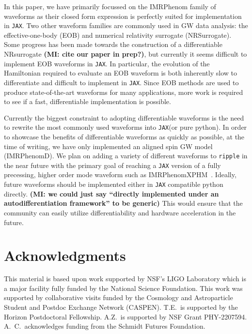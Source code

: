 \documentclass[twocolumn]{aastex631}
\newcommand{\jax}{\texttt{JAX}\xspace}
\newcommand{\ripple}{\texttt{ripple}\xspace}
\newcommand{\mi}[1]{\textbf{\color{teal}(MI: #1)}}
\newcommand{\amc}[1]{{\color{red}[AC: #1]}}
\begin{document}
In this paper, we have primarily focussed on the IMRPhenom family of waveforms as their closed form expression is perfectly suited for implementation in \jax.
Two other waveform families are commonly used in GW data analysis: the effective-one-body (EOB) and numerical relativity surrogate (NRSurrogate). 
Some progress has been made towards the construction of a differentiable NRsurrogate \mi{cite our paper in prep?}, but currently it seems difficult to implement EOB waveforms in \jax.
In particular, the evolution of the Hamiltonian required to evaluate an EOB waveform is both inherently slow to differentiate and difficult to implement in \jax. 
Since EOB methods are used to produce state-of-the-art waveforms for many applications, more work is required to see if a fast, differentiable implementation is possible.

Currently the biggest constraint to adopting differentiable waveforms is the need to rewrite the most commonly used waveforms into \jax (or pure python).
In order to showcase the benefits of differentiable waveforms as quickly as possible, at the time of writing, we have only implemented an aligned spin GW model (IMRPhenomD).
We plan on adding a variety of different waveforms to \ripple in the near future with the primary goal of reaching a \jax version of a fully precessing, higher order mode waveform such as IMRPhenomXPHM~\citep{Pratten:2020ceb}.
Ideally, future waveforms should be implemented either in \jax compatible python directly.
\mi{we could just say ``directly implemented under an autodifferentiation framework'' to be generic}
This would ensure that the community can easily utilize differentiability and hardware acceleration in the future.


\section{Acknowledgments}
This material is based upon work supported by NSF's LIGO Laboratory which is a major facility fully funded by the National Science Foundation.
This work was supported by collaborative visits funded by the Cosmology and Astroparticle Student and Postdoc Exchange Network (CASPEN). 
T.E.\ is supported by the Horizon Postdoctoral Fellowship.
A.Z.~is supported by NSF Grant PHY-2207594.
A.~C.\ acknowledges funding from the Schmidt Futures Foundation.


\end{document}
